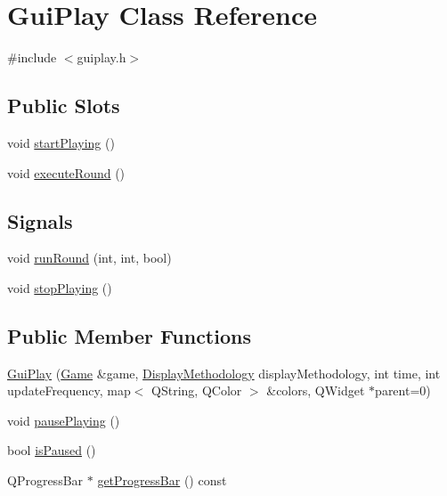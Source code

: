 \hypertarget{class_gui_play}{
\section{GuiPlay Class Reference}
\label{class_gui_play}
}


{\ttfamily \#include $<$guiplay.h$>$}

\subsection*{Public Slots}
\begin{DoxyCompactItemize}
\item 
void \hyperlink{class_gui_play_a3ee52f6eafb9e770ac3c7c08338de5a0}{startPlaying} ()
\item 
void \hyperlink{class_gui_play_a56e08410e19c420ee0b25864178c406c}{executeRound} ()
\end{DoxyCompactItemize}
\subsection*{Signals}
\begin{DoxyCompactItemize}
\item 
void \hyperlink{class_gui_play_a84eda0efc5b7998010283eddfa9cf6b8}{runRound} (int, int, bool)
\item 
void \hyperlink{class_gui_play_abc7f6a475d57e71822b0dff2851497ad}{stopPlaying} ()
\end{DoxyCompactItemize}
\subsection*{Public Member Functions}
\begin{DoxyCompactItemize}
\item 
\hyperlink{class_gui_play_a763720422125bc6ddde93472bc161eee}{GuiPlay} (\hyperlink{class_game}{Game} \&game, \hyperlink{guicommon_8h_ab73f4a618a1a86d78e9cc82ff1c376df}{DisplayMethodology} displayMethodology, int time, int updateFrequency, map$<$ QString, QColor $>$ \&colors, QWidget $\ast$parent=0)
\item 
void \hyperlink{class_gui_play_a28ceab1b46e252e30c9f7858450b0de9}{pausePlaying} ()
\item 
bool \hyperlink{class_gui_play_ae67f437ee24b0bc1758e2176b9c119d5}{isPaused} ()
\item 
QProgressBar $\ast$ \hyperlink{class_gui_play_aeb3c459efc257be1e8dd8846189fb98c}{getProgressBar} () const 
\end{DoxyCompactItemize}


